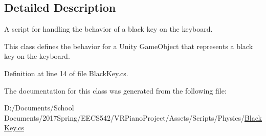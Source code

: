 \subsection{Detailed Description}
A script for handling the behavior of a black key on the keyboard. 

This class defines the behavior for a Unity Game\+Object that represents a black key on the keyboard. 

Definition at line 14 of file Black\+Key.\+cs.



The documentation for this class was generated from the following file\+:\begin{DoxyCompactItemize}
\item 
D\+:/\+Documents/\+School Documents/2017\+Spring/\+E\+E\+C\+S542/\+V\+R\+Piano\+Project/\+Assets/\+Scripts/\+Physics/\hyperlink{_black_key_8cs}{Black\+Key.\+cs}\end{DoxyCompactItemize}
